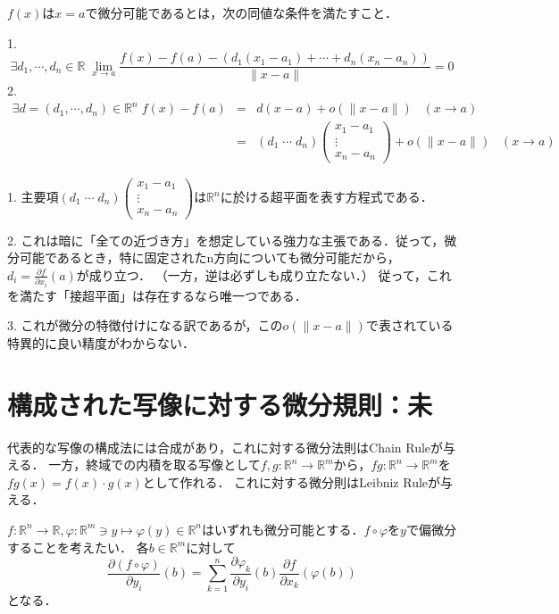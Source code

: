 \documentclass[uplatex, dvipdfmx]{jsreport}
\begin{document}
\begin{definition}[（全）微分可能性]
    $f(x)$は$x=a$で微分可能であるとは，次の同値な条件を満たすこと．

    1. \[ \exists d_1,\cdots,d_n\in\mathbb{R}\; \lim_{x\to a}\frac{f(x)-f(a)-(d_1(x_1-a_1)+\cdots+d_n(x_n-a_n))}{\|x-a\|} = 0 \]
    2. \begin{eqnarray*} \exists d=(d_1,\cdots,d_n)\in\mathbb{R}^n\; f(x)-f(a) &=& d(x-a) + o(\|x-a\|)\;\;\; (x\to a) \\
        &=& (d_1\;\cdots\;d_n)\begin{pmatrix}x_1-a_1\\\vdots\\x_n-a_n\end{pmatrix} + o(\|x-a\|)\;\;\; (x\to a)  \end{eqnarray*}
\end{definition}
\begin{remark}
    1. 主要項$(d_1\;\cdots\;d_n)\begin{pmatrix}x_1-a_1\\\vdots\\x_n-a_n\end{pmatrix}$は$\mathbb{R}^n$に於ける超平面を表す方程式である．

    2. これは暗に「全ての近づき方」を想定している強力な主張である．従って，微分可能であるとき，特に固定されたn方向についても微分可能だから，$d_i=\frac{\partial f}{\partial x_i}(a)$が成り立つ．
    （一方，逆は必ずしも成り立たない．）
    従って，これを満たす「接超平面」は存在するなら唯一つである．

    3. これが微分の特徴付けになる訳であるが，この$o(\|x-a\|)$で表されている特異的に良い精度がわからない．
\end{remark}

\section{構成された写像に対する微分規則：未}
代表的な写像の構成法には合成があり，これに対する微分法則はChain Ruleが与える．
一方，終域での内積を取る写像として$f,g:\mathbb{R}^n\to\mathbb{R}^m$から，$fg:\mathbb{R}^n\to\mathbb{R}^m$を$fg(x)=f(x)\cdot g(x)$として作れる．
これに対する微分則はLeibniz Ruleが与える．

\begin{theorem}
    $f:\mathbb{R}^n\to\mathbb{R}, \varphi:\mathbb{R}^m\ni y\mapsto \varphi(y)\in\mathbb{R}^n$はいずれも微分可能とする．$f\circ \varphi$を$y$で偏微分することを考えたい．
    各$b\in\mathbb{R}^m$に対して
    \[ \frac{\partial (f\circ\varphi)}{\partial y_i} (b) = \sum_{k=1}^n\frac{\partial \varphi_k}{\partial y_i}(b)\frac{\partial f}{\partial x_k}(\varphi(b)) \]
    となる．
\end{theorem}
\end{document}
